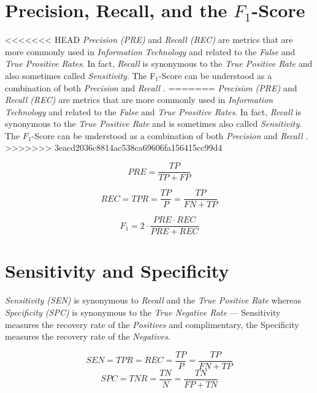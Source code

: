 \documentclass{article}
\begin{document}
\section{Precision, Recall, and the $F_1$-Score}

<<<<<<< HEAD
\emph{Precision (PRE)} and \emph{Recall (REC)} are metrics that are more commonly used in \emph{Information Technology} and related to the \emph {False} and \emph{True Prositive Rates}. In fact, \emph{Recall} is synonymous to the \emph{True Positive Rate} and also sometimes called \emph{Sensitivity}. The F$_1$-Score can be understood as a combination of both \emph{Precision} and \emph{Recall} \cite{goutte2005probabilistic}.
=======
\emph{Precision (PRE)} and \emph{Recall (REC)} are metrics that are more commonly used in \emph{Information Technology} and related to the \emph {False} and \emph{True Prositive Rates}. In fact, \emph{Recall} is synonymous to the \emph{True Positive Rate} and is sometimes also called \emph{Sensitivity}. The $F_1$-Score can be understood as a combination of both \emph{Precision} and \emph{Recall} \cite{goutte2005probabilistic}.
>>>>>>> 3eacd2036c8814ac538ca69606fa156415cc99d4

\begin{equation} PRE = \frac{TP}{TP + FP} \end{equation}

\begin{equation} REC = TPR = \frac{TP}{P} =  \frac{TP}{FN + TP} \end{equation}

\begin{equation} F_1 = 2 \cdot \frac{PRE \cdot REC}{PRE + REC}\end{equation}





\section{Sensitivity and Specificity}

\emph{Sensitivity (SEN)} is synonymous to \emph{Recall} and the \emph{True Positive Rate} whereas \emph{Specificity (SPC)} is synonymous to the \emph{True Negative Rate} --- Sensitivity measures the recovery rate of the \emph{Positives} and complimentary, the Specificity  measures the recovery rate of the \emph{Negatives}.

\begin{equation} SEN = TPR = REC = \frac{TP}{P} =  \frac{TP}{FN + TP} \end{equation}
\begin{equation} SPC = TNR =\frac{TN}{N} =  \frac{TN}{FP + TN} \end{equation}
\end{document}
